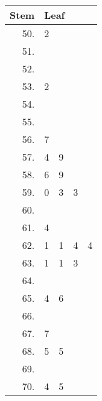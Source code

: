 \begin{tabular}{r|cccc}
  \hline
  Stem & \multicolumn{4}{l}{Leaf} \\
  \hline
  50. & 2 &   &   &   \\
  51. &   &   &   &   \\
  52. &   &   &   &   \\
  53. & 2 &   &   &   \\
  54. &   &   &   &   \\
  55. &   &   &   &   \\
  56. & 7 &   &   &   \\
  57. & 4 & 9 &   &   \\
  58. & 6 & 9 &   &   \\
  59. & 0 & 3 & 3 &   \\
  60. &   &   &   &   \\
  61. & 4 &   &   &   \\
  62. & 1 & 1 & 4 & 4 \\
  63. & 1 & 1 & 3 &   \\
  64. &   &   &   &   \\
  65. & 4 & 6 &   &   \\
  66. &   &   &   &   \\
  67. & 7 &   &   &   \\
  68. & 5 & 5 &   &   \\
  69. &   &   &   &   \\
  70. & 4 & 5 &   &   \\
  \hline
\end{tabular}

